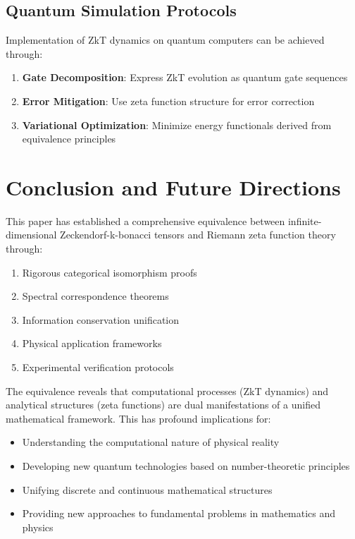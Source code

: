 \documentclass[12pt]{article}
\theoremstyle{plain}
\theoremstyle{definition}
\begin{document}
\subsection{Quantum Simulation Protocols}

Implementation of ZkT dynamics on quantum computers can be achieved through:
\begin{enumerate}
\item \textbf{Gate Decomposition}: Express ZkT evolution as quantum gate sequences
\item \textbf{Error Mitigation}: Use zeta function structure for error correction
\item \textbf{Variational Optimization}: Minimize energy functionals derived from equivalence principles
\end{enumerate}

\section{Conclusion and Future Directions}

This paper has established a comprehensive equivalence between infinite-dimensional Zeckendorf-k-bonacci tensors and Riemann zeta function theory through:

\begin{enumerate}
\item Rigorous categorical isomorphism proofs
\item Spectral correspondence theorems
\item Information conservation unification
\item Physical application frameworks
\item Experimental verification protocols
\end{enumerate}

The equivalence reveals that computational processes (ZkT dynamics) and analytical structures (zeta functions) are dual manifestations of a unified mathematical framework. This has profound implications for:

\begin{itemize}
\item Understanding the computational nature of physical reality
\item Developing new quantum technologies based on number-theoretic principles
\item Unifying discrete and continuous mathematical structures
\item Providing new approaches to fundamental problems in mathematics and physics
\end{itemize}
\end{document}
